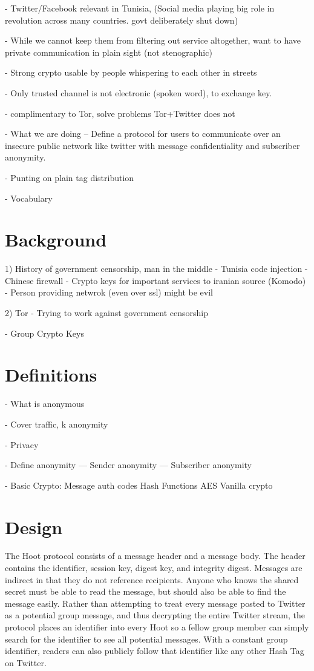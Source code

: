 \documentclass{acm_proc_article-sp}
\begin{document}
- Twitter/Facebook relevant in Tunisia, (Social media playing big role in revolution across many countries. govt deliberately shut down)

- While we cannot keep them from filtering out service altogether,
want to have private communication in plain sight (not stenographic)

- Strong crypto usable by people whispering to each other in streets

- Only trusted channel is not electronic (spoken word), to exchange key.


- complimentary to Tor, solve problems Tor+Twitter does not

- What we are doing
-- Define a protocol for users to communicate over an insecure public network like twitter with message confidentiality and subscriber anonymity. 

- Punting on plain tag distribution

- Vocabulary

\section{Background}

1) History of government censorship, man in the middle
	- Tunisia code injection
	- Chinese firewall
	- Crypto keys for important services to iranian source (Komodo)
	- Person providing netwrok (even over ssl) might be evil

2) Tor
	- Trying to work against government censorship
	
- Group Crypto Keys
	
\section{Definitions}

- What is anonymous

- Cover traffic, k anonymity

- Privacy

- Define anonymity
--- Sender anonymity
--- Subscriber anonymity

- Basic Crypto:
	Message auth codes
	Hash Functions
	AES
	Vanilla crypto

\section{Design}

The Hoot protocol consists of a message header and a message body. The header contains the identifier, session key, digest key, and integrity digest. Messages are indirect in that they do not reference recipients. Anyone who knows the shared secret must be able to read the message, but should also be able to find the message easily. Rather than attempting to treat every message posted to Twitter as a potential group message, and thus decrypting the entire Twitter stream, the protocol places an identifier into every Hoot so a fellow group member can simply search for the identifier to see all potential messages. With a constant group identifier, readers can also publicly follow that identifier like any other Hash Tag on Twitter.
\end{document}
